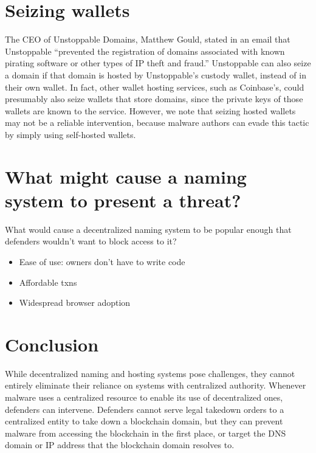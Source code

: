 \documentclass[10pt,sigconf,letterpaper]{acmart}
\begin{document}
\section{Seizing wallets}

The CEO of Unstoppable Domains, Matthew Gould, stated in an email that Unstoppable ``prevented the 
registration of domains associated with known pirating software or other types of IP theft and 
fraud.'' Unstoppable can also seize a domain if that domain is hosted by Unstoppable's custody 
wallet, instead of in their own wallet. In fact, other wallet hosting services, such as Coinbase's, 
could presumably also seize wallets that store domains, since the private keys of those wallets are 
known to the service. However, we note that seizing hosted wallets may not be a reliable 
intervention, because malware authors can evade this tactic by simply using self-hosted wallets. 

\section{What might cause a naming system to present a threat?}

What would cause a decentralized naming system to be popular enough that 
defenders wouldn't want to block access to it?
\begin{itemize}
	\item Ease of use: owners don't have to write code
	\item Affordable txns
	\item Widespread browser adoption
\end{itemize}

\section{Conclusion}

While decentralized naming and hosting systems pose challenges, they cannot entirely 
eliminate their reliance on systems with centralized authority. Whenever malware uses a centralized 
resource to enable its use of decentralized ones, defenders can intervene. Defenders cannot serve 
legal takedown orders to a centralized entity to take 
down a blockchain domain, but they can prevent malware from accessing the blockchain in the first 
place, or target the DNS domain or IP address that the blockchain domain resolves to.
\end{document}
